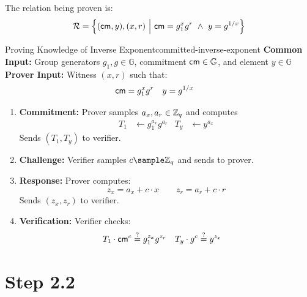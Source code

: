 The relation being proven is:
\[
\mathcal{R} = \left\{ (\cm, y), (x, r) \ \middle|\ \cm = g_1^x g^r \ \land\ y = g^{1/x} \right\}
\]


\begin{protocol}{Proving Knowledge of Inverse Exponent}{committed-inverse-exponent}\label{pok-committed-inverse-exponent}
\textbf{Common Input:} Group generators $g_1, g \in \mathbb{G}$, commitment $\mathsf{cm} \in \mathbb{G}$, and element $y \in \mathbb{G}$\\
\textbf{Prover Input:} Witness $(x, r)$ such that:
    \begin{align*}
        \mathsf{cm} &= g_1^x g^r     &    y &= g^{1/x}
    \end{align*}
\begin{enumerate}
    \item \textbf{Commitment:} Prover samples $a_x, a_r \in \mathbb{Z}_q$ and computes \\
    \begin{align*}
        T_1 &\gets g_1^{a_x} g^{a_r}  &   T_y &\gets y^{a_x}
    \end{align*}
    Sends $(T_1, T_y)$ to verifier.
    
    \item \textbf{Challenge:} Verifier samples $c \sample \mathbb{Z}_q$ and sends to prover.
    
    \item \textbf{Response:} Prover computes:
    \[
        z_x = a_x + c \cdot x \qquad z_r = a_r + c \cdot r
    \]
    Sends $(z_x, z_r)$ to verifier.
    
    \item \textbf{Verification:} Verifier checks:
    \begin{align*}
        T_1 \cdot \mathsf{cm}^c &\stackrel{?}{=} g_1^{z_x} g^{z_r}  &
        T_y \cdot g^c &\stackrel{?}{=} y^{z_x}
    \end{align*}
\end{enumerate}
\end{protocol}


\newpage
\section{Step 2.2}

